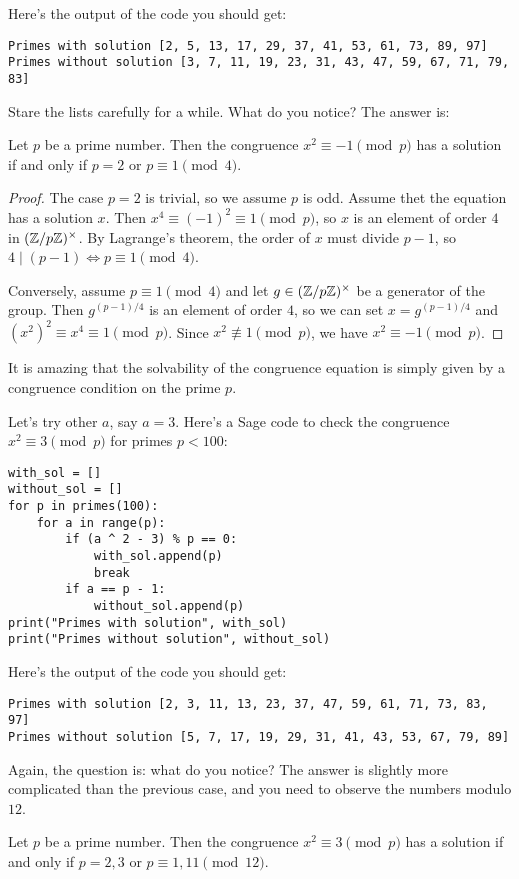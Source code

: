 Here's the output of the code you should get:
\begin{verbatim}
Primes with solution [2, 5, 13, 17, 29, 37, 41, 53, 61, 73, 89, 97]
Primes without solution [3, 7, 11, 19, 23, 31, 43, 47, 59, 67, 71, 79, 83]
\end{verbatim}

Stare the lists carefully for a while. What do you notice?
The answer is:

\begin{theorem}
    \label{thm:m1sq}
    Let $p$ be a prime number. Then the congruence $x^2 \equiv -1 \pmod{p}$ has a solution if and only if $p = 2$ or $p \equiv 1 \pmod{4}$.
\end{theorem}
\begin{proof}
    The case $p = 2$ is trivial, so we assume $p$ is odd.
    Assume thet the equation has a solution $x$.
    Then $x^4 \equiv (-1)^2 \equiv 1 \pmod{p}$, so $x$ is an element of order $4$ in $(\mathbb{Z} / p\mathbb{Z})^\times$. 
    By Lagrange's theorem, the order of $x$ must divide $p - 1$, so $4 \mid (p - 1) \Leftrightarrow p \equiv 1 \pmod{4}$.

    Conversely, assume $p \equiv 1 \pmod{4}$ and let $g \in (\mathbb{Z} / p \mathbb{Z})^\times$ be a generator of the group.
    Then $g^{(p - 1) / 4}$ is an element of order $4$, so we can set $x = g^{(p - 1) / 4}$ and $(x^2)^2 \equiv x^4 \equiv 1 \pmod{p}$.
    Since $x^2 \not\equiv 1 \pmod{p}$, we have $x^2 \equiv -1 \pmod{p}$.
\end{proof}

It is amazing that the solvability of the congruence equation is simply given by a congruence condition on the prime $p$.

Let's try other $a$, say $a = 3$.
Here's a Sage code to check the congruence $x^2 \equiv 3 \pmod{p}$ for primes $p < 100$:
\begin{verbatim}
with_sol = []
without_sol = []
for p in primes(100):
    for a in range(p):
        if (a ^ 2 - 3) % p == 0:
            with_sol.append(p)
            break
        if a == p - 1:
            without_sol.append(p)
print("Primes with solution", with_sol)
print("Primes without solution", without_sol)
\end{verbatim}
Here's the output of the code you should get:
\begin{verbatim}
Primes with solution [2, 3, 11, 13, 23, 37, 47, 59, 61, 71, 73, 83, 97]
Primes without solution [5, 7, 17, 19, 29, 31, 41, 43, 53, 67, 79, 89]
\end{verbatim}
Again, the question is: what do you notice?
The answer is slightly more complicated than the previous case, and you need to observe the numbers modulo $12$.
\begin{theorem}
    \label{thm:m3sq}
    Let $p$ be a prime number. Then the congruence $x^2 \equiv 3 \pmod{p}$ has a solution if and only if $p = 2, 3$ or $p \equiv 1, 11 \pmod{12}$.
\end{theorem}

